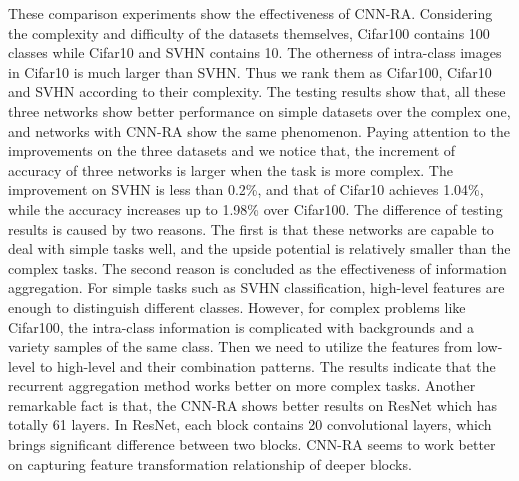 \documentclass[runningheads]{llncs}
\begin{document}
These comparison experiments show the effectiveness of CNN-RA. Considering the complexity and difficulty of the datasets themselves, Cifar100 contains 100 classes while Cifar10 and SVHN contains 10. The otherness of intra-class images in Cifar10 is much larger than SVHN. Thus we rank them as Cifar100, Cifar10 and SVHN according to their complexity. The testing results show that, all these three networks show better performance on simple datasets over the complex one, and networks with CNN-RA show the same phenomenon. Paying attention to the improvements on the three datasets and we notice that, the increment of accuracy of three networks is larger when the task is more complex. The improvement on SVHN is less than 0.2\%, and that of Cifar10 achieves 1.04\%, while the accuracy increases up to 1.98\% over Cifar100. The difference of testing results is caused by two reasons. The first is that these networks are capable to deal with simple tasks well, and the upside potential is relatively smaller than the complex tasks. The second reason is concluded as the effectiveness of information aggregation. For simple tasks such as SVHN classification, high-level features are enough to distinguish different classes. However, for complex problems like Cifar100, the intra-class information is complicated with backgrounds and a variety samples of the same class. Then we need to utilize the features from low-level to high-level and their combination patterns. The results indicate that the recurrent aggregation method works better on more complex tasks. Another remarkable fact is that, the CNN-RA shows better results on ResNet which has totally 61 layers. In ResNet, each block contains 20 convolutional layers, which brings significant difference between two blocks. CNN-RA seems to work better on capturing feature transformation relationship of deeper blocks.
\end{document}
